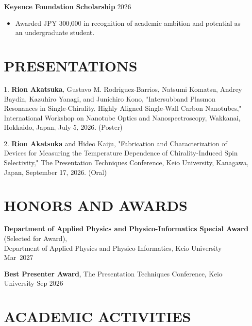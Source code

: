 \documentclass[11pt]{article}
\newcommand{\highlight}[1]{\textcolor{blue!60!cyan}{\textbf{#1}}}
\begin{document}
\textbf{Keyence Foundation Scholarship}
\hfill 2026
\begin{itemize}
\item Awarded JPY 300,000 in recognition of academic ambition
and potential as an undergraduate student.
\end{itemize}



\section*{PRESENTATIONS}

1. \textbf{Rion Akatsuka}, Gustavo M. Rodriguez-Barrios, Natsumi Komatsu, Andrey Baydin, Kazuhiro Yanagi, and Junichiro Kono, "Intersubband Plasmon Resonances in Single-Chirality, Highly Aligned Single-Wall Carbon Nanotubes,"
International Workshop on Nanotube Optics and Nanospectroscopy, Wakkanai, Hokkaido, Japan, July 5, 2026. (Poster)
\vspace{5pt}

2. \textbf{Rion Akatsuka} and Hideo Kaiju, "Fabrication and Characterization of Devices for Measuring the Temperature Dependence of Chirality-Induced Spin Selectivity," The Presentation Techniques Conference, Keio University, Kanagawa, Japan, September 17, 2026. (Oral)




\section*{HONORS AND AWARDS}
\highlight{Department of Applied Physics and Physico-Informatics Special Award} (Selected for Award), \\
Department of Applied Physics and Physico-Informatics, Keio University
\hfill \mbox{Mar 2027}

\vspace{3pt}

\highlight{Best Presenter Award}, The Presentation Techniques Conference, Keio University
\hfill Sep 2026



\section*{ACADEMIC ACTIVITIES}
\end{document}

